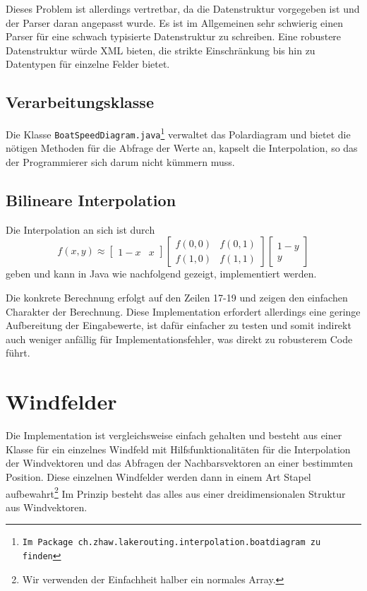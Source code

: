 Dieses Problem ist allerdings vertretbar, da die Datenstruktur vorgegeben ist
und der Parser daran angepasst wurde. Es ist im Allgemeinen sehr schwierig
einen Parser für eine schwach typisierte Datenstruktur zu schreiben. Eine
robustere Datenstruktur würde XML bieten, die strikte Einschränkung bis hin zu
Datentypen für einzelne Felder bietet.

\subsection{Verarbeitungsklasse}
Die Klasse \texttt{BoatSpeedDiagram.java\footnote{Im Package
ch.zhaw.lakerouting.interpolation.boatdiagram zu finden}} verwaltet das
Polardiagram und bietet die nötigen Methoden für die Abfrage der Werte an,
kapselt die Interpolation, so das der Programmierer sich darum nicht kümmern
muss.

\subsection{Bilineare Interpolation}\label{sss:bilinearinterpolation}
Die Interpolation an sich ist durch 
\begin{equation}
f(x,y) \approx \begin{bmatrix} 1-x & x \end{bmatrix} \begin{bmatrix}
f(0,0) & f(0,1) \\ f(1,0) & f(1,1) \end{bmatrix} \begin{bmatrix} 1 - y
\\ y \end{bmatrix}
\label{eq:bilineareinterpolation}
\end{equation}
geben und kann in Java wie nachfolgend gezeigt, implementiert werden.

 
Die konkrete Berechnung erfolgt auf den Zeilen 17-19 und zeigen den einfachen
Charakter der Berechnung. Diese Implementation erfordert allerdings eine
geringe Aufbereitung der Eingabewerte, ist dafür einfacher zu testen und somit
indirekt auch weniger anfällig für Implementationsfehler, was direkt zu
robusterem Code führt.

\section{Windfelder}
Die Implementation ist vergleichsweise einfach gehalten und besteht aus einer
Klasse für ein einzelnes Windfeld mit Hilfsfunktionalitäten für die
Interpolation der Windvektoren und das Abfragen der Nachbarsvektoren an einer
bestimmten Position. Diese einzelnen Windfelder werden dann in einem Art Stapel
aufbewahrt\footnote{Wir verwenden der Einfachheit halber ein normales Array.}
Im Prinzip besteht das alles aus einer dreidimensionalen Struktur aus
Windvektoren.

